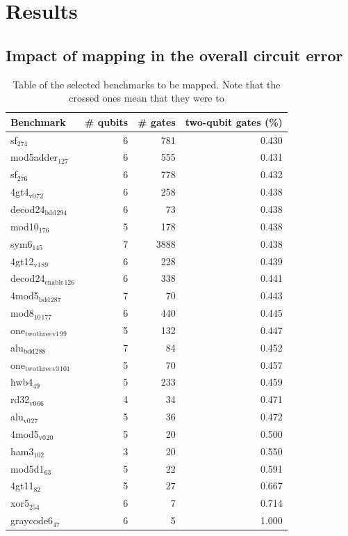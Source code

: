 
\chapter{Results}
\label{sec:org7081afb}

\section{Impact of mapping in the overall circuit error}
\label{sec:orgd8582a3}

\begin{table}[htbp]
\caption{Table of the selected benchmarks to be mapped. Note that the crossed ones mean that they were to}
\centering
\small
\begin{tabular}{lrrr}
\hline
Benchmark & \# qubits & \# gates & two-qubit gates (\%)\\
\hline
sf\(_{\text{274}}\) & 6 & 781 & 0.430\\
mod5adder\(_{\text{127}}\) & 6 & 555 & 0.431\\
sf\(_{\text{276}}\) & 6 & 778 & 0.432\\
4gt4\(_{\text{v0}}\)\(_{\text{72}}\) & 6 & 258 & 0.438\\
decod24\(_{\text{bdd}}\)\(_{\text{294}}\) & 6 & 73 & 0.438\\
mod10\(_{\text{176}}\) & 5 & 178 & 0.438\\
sym6\(_{\text{145}}\) & 7 & 3888 & 0.438\\
4gt12\(_{\text{v1}}\)\(_{\text{89}}\) & 6 & 228 & 0.439\\
decod24\(_{\text{enable}}\)\(_{\text{126}}\) & 6 & 338 & 0.441\\
4mod5\(_{\text{bdd}}\)\(_{\text{287}}\) & 7 & 70 & 0.443\\
mod8\(_{\text{10}}\)\(_{\text{177}}\) & 6 & 440 & 0.445\\
one\(_{\text{two}}\)\(_{\text{three}}\)\(_{\text{v1}}\)\(_{\text{99}}\) & 5 & 132 & 0.447\\
alu\(_{\text{bdd}}\)\(_{\text{288}}\) & 7 & 84 & 0.452\\
one\(_{\text{two}}\)\(_{\text{three}}\)\(_{\text{v3}}\)\(_{\text{101}}\) & 5 & 70 & 0.457\\
hwb4\(_{\text{49}}\) & 5 & 233 & 0.459\\
rd32\(_{\text{v0}}\)\(_{\text{66}}\) & 4 & 34 & 0.471\\
alu\(_{\text{v0}}\)\(_{\text{27}}\) & 5 & 36 & 0.472\\
4mod5\(_{\text{v0}}\)\(_{\text{20}}\) & 5 & 20 & 0.500\\
ham3\(_{\text{102}}\) & 3 & 20 & 0.550\\
mod5d1\(_{\text{63}}\) & 5 & 22 & 0.591\\
4gt11\(_{\text{82}}\) & 5 & 27 & 0.667\\
xor5\(_{\text{254}}\) & 6 & 7 & 0.714\\
graycode6\(_{\text{47}}\) & 6 & 5 & 1.000\\
\hline
\end{tabular}
\end{table}

